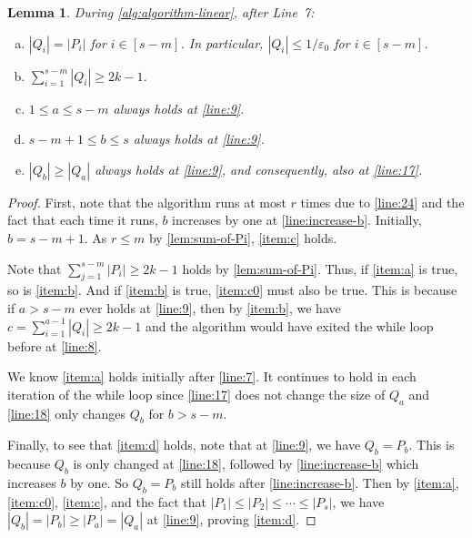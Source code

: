 \documentclass[11pt]{article}
\theoremstyle{plain}
\newtheorem{lemma}[thm]{Lemma}
\theoremstyle{definition}
\theoremstyle{remark}
\newcommand{\eps}{\varepsilon}
\begin{document}
\begin{lemma}\label{lem:basic-claims}
During \cref{alg:algorithm-linear}, after Line~7:
\begin{enumerate}[(a)]
\item\label{item:a}
 $|Q_i|=|P_i|$ for $i\in [s-m]$. In particular, $|Q_i|\leq 1/\eps_0$ for $i\in [s-m]$.
\item\label{item:b}
$\sum_{i=1}^{s-m}|Q_i|\geq 2k-1$.
\item\label{item:c0}
$1\leq a\leq s-m$ always holds at \cref{line:9}.
\item\label{item:c}
$s-m+1\leq b\leq s$ always holds at \cref{line:9}.
\item\label{item:d}
$|Q_{b}|\geq |Q_a|$ always holds at \cref{line:9}, and consequently, also at \cref{line:17}.

\end{enumerate}
\end{lemma}

\begin{proof} 
First, note that the algorithm runs  at most $r$ times due to \cref{line:24} and the fact that each time it runs, $b$ increases by one at \cref{line:increase-b}.
Initially, $b=s-m+1$.
As $r\leq m$ by \cref{lem:sum-of-Pi},  \cref{item:c} holds.


Note that $\sum_{j=1}^{s-m}|P_i|\geq 2k-1$ holds by \cref{lem:sum-of-Pi}. Thus, if \ref{item:a} is true, so is \ref{item:b}. 
And if \ref{item:b} is true,  \ref{item:c0} must also be true.
This is because if $a>s-m$ ever holds at \cref{line:9}, then by \ref{item:b}, we have $c=\sum_{i=1}^{a-1} |Q_i|\geq 2k-1$ and the algorithm would have exited the while loop before at \cref{line:8}.

We know \ref{item:a} holds initially after \cref{line:7}. It continues to hold in each iteration of the while loop since \cref{line:17} does not change the size of $Q_a$ and \cref{line:18} only changes $Q_b$ for $b>s-m$.

Finally, to see that \ref{item:d} holds, note that at \cref{line:9}, we have $Q_b=P_b$. This is because $Q_b$ is only changed at \cref{line:18}, followed by  \cref{line:increase-b} which increases $b$ by one. So $Q_b=P_b$ still holds after \cref{line:increase-b}.
Then by \ref{item:a}, \ref{item:c0}, \ref{item:c}, and the fact that $|P_1|\leq |P_2|\leq \cdots\leq |P_s|$, we have $|Q_b|=|P_b|\geq |P_a|=|Q_a|$ at  \cref{line:9}, proving \ref{item:d}.
\end{proof}
\end{document}
